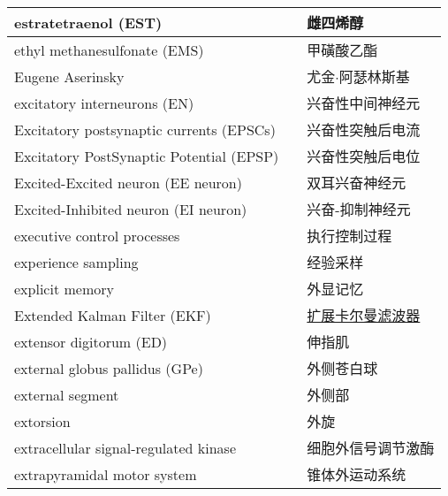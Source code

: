 \begin{longtable}{lll}
	\midrule
	estratetraenol (EST)   &&  雌四烯醇  \\
	
	\midrule
	ethyl methanesulfonate (EMS)    &&  甲磺酸乙酯  \\
	
	\midrule
	Eugene Aserinsky    &&  尤金$\cdot$阿瑟林斯基  \\
	
	\midrule
	excitatory interneurons  (EN)  &&  兴奋性中间神经元  \\
	
	\midrule
	Excitatory postsynaptic currents (EPSCs)     &&  兴奋性突触后电流  \\
	
	\midrule
	Excitatory PostSynaptic Potential (EPSP)     &&  兴奋性突触后电位  \\
	
	\midrule
	Excited-Excited neuron (EE neuron)     &&  双耳兴奋神经元  \\
	
	\midrule
	Excited-Inhibited neuron (EI neuron)     && 兴奋-抑制神经元   \\
	
	\midrule
	executive control processes     && 执行控制过程   \\
	
	\midrule
	experience sampling     && 经验采样   \\
	
	\midrule
	explicit memory     && 外显记忆   \\
	
	\midrule
	Extended Kalman Filter (EKF)     && \href{https://baike.baidu.com/item/EKF/9375021?fr=ge_ala}{扩展卡尔曼滤波器}   \\
	
	\midrule
	extensor digitorum (ED)     && 伸指肌   \\
	
	\midrule
	external globus pallidus (GPe)     && 外侧苍白球   \\
	
	\midrule
	external segment     && 外侧部   \\
	
	\midrule
	extorsion     && 外旋   \\
	
	\midrule
	extracellular signal-regulated kinase     && 细胞外信号调节激酶   \\
	
	\midrule
	extrapyramidal motor system     && 锥体外运动系统   \\
	

\end{longtable}
